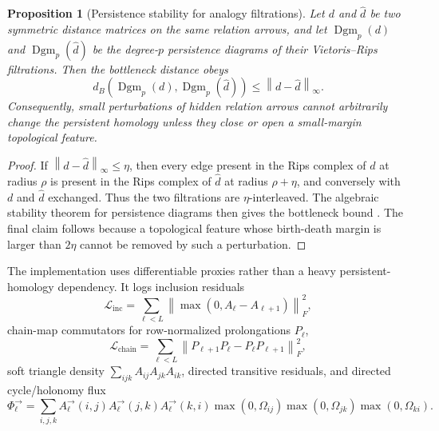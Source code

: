 \documentclass[11pt]{article}
\theoremstyle{definition}
\theoremstyle{plain}
\newtheorem{proposition}[definition]{Proposition}
\theoremstyle{remark}
\numberwithin{equation}{section}
\newcommand{\norm}[1]{\left\lVert #1\right\rVert}
\begin{document}
\begin{proposition}[Persistence stability for analogy filtrations]
Let $d$ and $\widehat d$ be two symmetric distance matrices on the same relation arrows, and let $\operatorname{Dgm}_p(d)$ and $\operatorname{Dgm}_p(\widehat d)$ be the degree-$p$ persistence diagrams of their Vietoris--Rips filtrations.  Then the bottleneck distance obeys
\begin{equation}
  d_B(\operatorname{Dgm}_p(d),\operatorname{Dgm}_p(\widehat d))
  \le \norm{d-\widehat d}_\infty.
\end{equation}
Consequently, small perturbations of hidden relation arrows cannot arbitrarily change the persistent homology unless they close or open a small-margin topological feature.
\end{proposition}

\begin{proof}
If $\norm{d-\widehat d}_\infty\le\eta$, then every edge present in the Rips complex of $d$ at radius $\rho$ is present in the Rips complex of $\widehat d$ at radius $\rho+\eta$, and conversely with $d$ and $\widehat d$ exchanged.  Thus the two filtrations are $\eta$-interleaved.  The algebraic stability theorem for persistence diagrams then gives the bottleneck bound \cite{cohensteiner2007stability,chazal2016structure}.  The final claim follows because a topological feature whose birth-death margin is larger than $2\eta$ cannot be removed by such a perturbation.
\end{proof}

The implementation uses differentiable proxies rather than a heavy persistent-homology dependency.  It logs inclusion residuals
\begin{equation}
  \mathcal L_{\mathrm{inc}}=\sum_{\ell<L}\norm{\max(0,A_\ell-A_{\ell+1})}_F^2,
\end{equation}
chain-map commutators for row-normalized prolongations $P_\ell$,
\begin{equation}
  \mathcal L_{\mathrm{chain}}=\sum_{\ell<L}\norm{P_{\ell+1}P_\ell-P_\ell P_{\ell+1}}_F^2,
\end{equation}
soft triangle density $\sum_{ijk}A_{ij}A_{jk}A_{ik}$, directed transitive residuals, and directed cycle/holonomy flux
\begin{equation}
  \Phi_\ell^\rightarrow
  =\sum_{i,j,k}A_\ell^\rightarrow(i,j)
  A_\ell^\rightarrow(j,k)A_\ell^\rightarrow(k,i)
  \max(0,\Omega_{ij})\max(0,\Omega_{jk})\max(0,\Omega_{ki}).
\end{equation}
\end{document}
